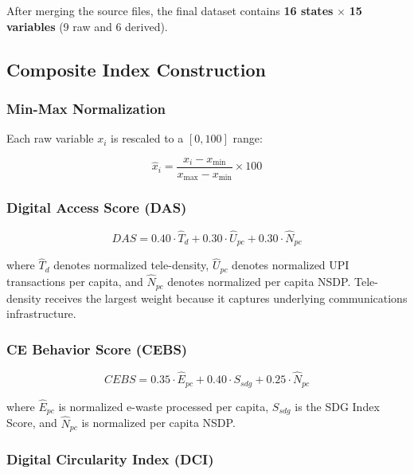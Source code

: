 \documentclass[conference]{IEEEtran}
\begin{document}
After merging the source files, the final dataset contains \textbf{16 states} $\times$ \textbf{15 variables} (9 raw and 6 derived).

\subsection{Composite Index Construction}

\subsubsection{Min-Max Normalization}

Each raw variable $x_i$ is rescaled to a $[0, 100]$ range:

\begin{equation}
    \hat{x}_i = \frac{x_i - x_{\min}}{x_{\max} - x_{\min}} \times 100
\end{equation}

\subsubsection{Digital Access Score (DAS)}

\begin{equation}
    DAS = 0.40 \cdot \hat{T}_d + 0.30 \cdot \hat{U}_{pc} + 0.30 \cdot \hat{N}_{pc}
\end{equation}

\noindent where $\hat{T}_d$ denotes normalized tele-density, $\hat{U}_{pc}$ denotes normalized UPI transactions per capita, and $\hat{N}_{pc}$ denotes normalized per capita NSDP. Tele-density receives the largest weight because it captures underlying communications infrastructure.

\subsubsection{CE Behavior Score (CEBS)}

\begin{equation}
    CEBS = 0.35 \cdot \hat{E}_{pc} + 0.40 \cdot S_{sdg} + 0.25 \cdot \hat{N}_{pc}
\end{equation}

\noindent where $\hat{E}_{pc}$ is normalized e-waste processed per capita, $S_{sdg}$ is the SDG Index Score, and $\hat{N}_{pc}$ is normalized per capita NSDP.

\subsubsection{Digital Circularity Index (DCI)}
\end{document}
